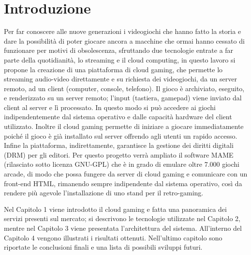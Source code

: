%
%

\chapter*{Introduzione}
Per far conoscere alle nuove generazioni i videogiochi che hanno fatto la storia e dare la possibilità di poter giocare ancora a macchine che ormai hanno cessato di funzionare per motivi di obsolescenza, sfruttando due tecnologie entrate a far parte della quotidianità, lo streaming e il cloud computing, in questo lavoro si propone la creazione di una piattaforma di cloud gaming, che permette lo streaming audio-video direttamente e su richiesta dei videogiochi, da un server remoto, ad un client (computer, console, telefono). Il gioco è archiviato, eseguito, e renderizzato su un server remoto; l'input (tastiera, gamepad) viene inviato dal client al server e lì processato. In questo modo si può accedere ai giochi indipendentemente dal sistema operativo e dalle capacità hardware del client utilizzato. Inoltre il cloud gaming permette di iniziare a giocare immediatamente poiché il gioco è già installato sul server offrendo agli utenti un rapido accesso. Infine la piattaforma, indirettamente, garantisce la gestione dei diritti digitali (DRM) per gli editori. Per questo progetto verrà ampliato il software MAME (rilasciato sotto licenza GNU-GPL) che è in grado di emulare oltre 7.000 giochi arcade, di modo che possa fungere da server di cloud gaming e comunicare con un front-end HTML, rimanendo sempre indipendente dal sistema operativo, così da rendere più agevole l’installazione di uno stand per il retro-gaming.

Nel Capitolo 1 viene introdotto il cloud gaming e fatta una panoramica dei servizi presenti sul mercato; si descrivono le tecnologie utilizzate nel Capitolo 2, mentre nel Capitolo 3 viene presentata l'architettura del sistema. All’interno del Capitolo 4 vengono illustrati i risultati ottenuti. Nell'ultimo capitolo sono riportate le conclusioni finali e una lista di possibili sviluppi futuri.